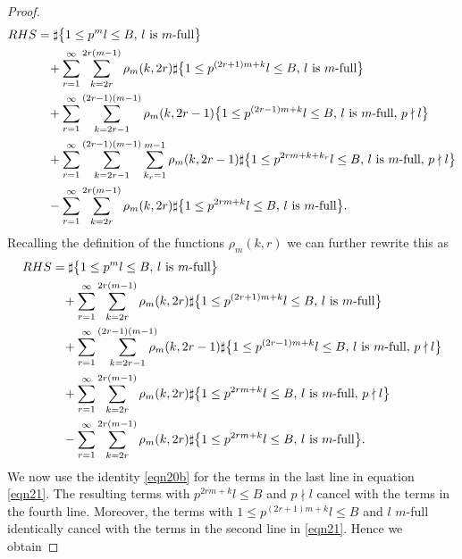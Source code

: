 \begin{proof}
\begin{equation*}
\begin{split}
RHS &=\sharp\bigl\{1\leq p^ml\leq B,\, l \mbox{ is $m$-full}\bigr\} \\
&\hspace*{3mm}+\sum_{r=1}^{\infty} \sum_{k=2r}^{2r(m-1)}\rho_m(k,2r)\sharp\bigl\{1\leq p^{(2r+1)m+k}l\leq B,\, l \mbox{ is $m$-full}\bigr\}\\
&\hspace*{3mm}+ \sum_{r=1}^\infty\sum_{k=2r-1}^{(2r-1)(m-1)}\rho_m(k,2r-1)\bigl\{1\leq p^{(2r-1)m+k}l\leq B,\, l \mbox{ is $m$-full},\, p\nmid l\bigr\}\\
&\hspace*{3mm}+ \sum_{r=1}^\infty\sum_{k=2r-1}^{(2r-1)(m-1)}\sum_{k_r=1}^{m-1}\rho_m(k,2r-1)\sharp\bigl\{1\leq p^{2rm+k+k_r}l\leq B,\, l \mbox{ is $m$-full},\, p\nmid l\bigr\}\\
&\hspace*{3mm}-\sum_{r=1}^\infty\sum_{k=2r}^{2r(m-1)}\rho_m(k,2r)\sharp\bigl\{1\leq p^{2rm+k}l\leq B,\, l \mbox{ is $m$-full}\bigr\}.
\end{split}
\end{equation*}
Recalling the definition of the functions $\rho_m(k,r)$ we can further rewrite this as
\begin{align}\label{eqn21}
RHS &=\sharp\bigl\{1\leq p^ml\leq B,\, l \mbox{ is $m$-full}\bigr\}\notag \\
&\hspace*{3mm}+\sum_{r=1}^{\infty} \sum_{k=2r}^{2r(m-1)}\rho_m(k,2r)\sharp\bigl\{1\leq p^{(2r+1)m+k}l\leq B,\, l \mbox{ is $m$-full}\bigr\}\notag\\
&\hspace*{3mm}+ \sum_{r=1}^\infty\sum_{k=2r-1}^{(2r-1)(m-1)}\hspace*{-3mm}\rho_m(k,2r-1)\sharp\bigl\{1\leq p^{(2r-1)m+k}l\leq B,\, l \mbox{ is $m$-full},\, p\nmid l\bigr\}\\
&\hspace*{3mm}+ \sum_{r=1}^\infty\sum_{k=2r}^{2r(m-1)}\rho_m(k,2r)\sharp\bigl\{1\leq p^{2rm+k}l\leq B,\, l \mbox{ is $m$-full},\, p\nmid l\bigr\}\notag\\
&\hspace*{3mm}-\sum_{r=1}^\infty\sum_{k=2r}^{2r(m-1)}\rho_m(k,2r)\sharp\bigl\{1\leq p^{2rm+k}l\leq B,\, l \mbox{ is $m$-full}\bigr\}.\notag
\end{align}
We now use the identity \eqref{eqn20b} for the terms in the last line in equation \eqref{eqn21}. The resulting terms with $p^{2rm+k}l\leq B$ and $p\nmid l$ cancel with the terms in the fourth line. Moreover, the terms with $1\leq p^{(2r+1)m+k}l\leq B$ and $l$ $m$-full identically cancel with the terms in the second line in \eqref{eqn21}. Hence we obtain

\end{proof}
